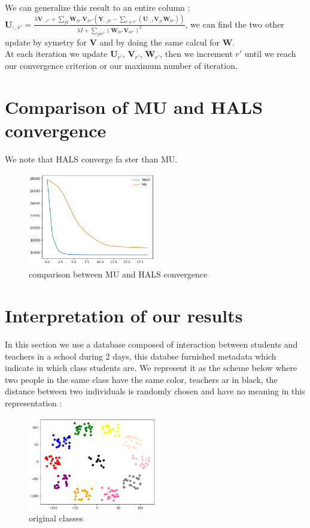 \documentclass{article}
\begin{document}
We can generalize this result to an entire column : $\mathbf{U}_{:,r'} = \frac{\lambda \mathbf{V}_{:,r'} + \sum_{jk}\mathbf{W}_{kr'}\mathbf{V}_{kr'}(\mathbf{Y}_{:,jk}-\sum_{r \ne r'}(\mathbf{U}_{:,r}\mathbf{V}_{jr}\mathbf{W}_{kr}))}{\lambda I + \sum_{jkr'}(\mathbf{W}_{kr'}\mathbf{V}_{kr'})^2}$,
we can find the two other update by symetry for $\mathbf{V}$ and by doing the same calcul for $\mathbf{W}$.\\

At each iteration we update $\mathbf{U}_{r'}$, $\mathbf{V}_{r'}$, $\mathbf{W}_{r'}$,  then we increment $r'$ until we reach our convergence criterion or our maximum number of iteration.

\section{Comparison of MU and HALS convergence}

We note that HALS converge fa   ster than MU.

\begin{figure}[H]
    \centering
    \includegraphics[width=0.5\textwidth]{images/comparison_HALS_MU.png}
    \caption{comparison between MU and HALS convergence}
\end{figure}



\section{Interpretation of our results}

In this section we use a database composed of interaction between students and teachers in a school during 2 days, this databse furnished
metadata which indicate in which class students are. We represent it as the scheme below where two people in the same class have the same color, teachers ar in black,
the distance between two individuals is randomly chosen and have no meaning in this representation :

\begin{figure}[h]
    \centering
    \includegraphics[width=0.5\textwidth]{images/original_class.png}
    \caption{original classes}
\end{figure}
\end{document}
